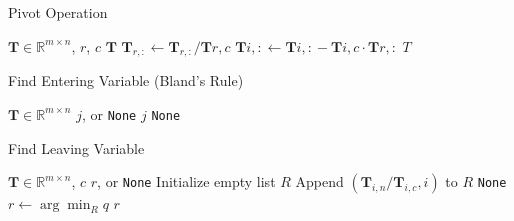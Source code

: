 \documentclass[conference]{IEEEtran}
\begin{document}
\begin{algorithm}
\caption{Pivot Operation}
\label{alg:pivot}
\begin{algorithmic}[1]
\Require $\textbf{T} \in \mathbb{R}^{m \times n}$, $r$, $c$
\Ensure $\textbf{T}$
\State $\textbf{T}_{r, :} \gets \textbf{T}_{r, :} / \textbf{T}{r, c}$ 
    \State $\textbf{T}{i, :} \gets \textbf{T}{i, :} - \textbf{T}{i, c} \cdot \textbf{T}{r, :}$ 
\EndFor
\State \Return $T$ 
\end{algorithmic}
\end{algorithm}

\begin{algorithm}
\caption{Find Entering Variable (Bland's Rule)}
\label{alg:entering}
\begin{algorithmic}[1]
\Require $\textbf{T} \in \mathbb{R}^{m \times n}$ 
\Ensure $j$, or \texttt{None}
        \State \Return $j$ 
    \EndIf
\EndFor
\State \Return \texttt{None} 
\end{algorithmic}
\end{algorithm}

\begin{algorithm}
\caption{Find Leaving Variable}
\label{alg:leaving}
\begin{algorithmic}[1]
\Require $\textbf{T} \in \mathbb{R}^{m \times n}$, $c$
\Ensure $r$, or \texttt{None}
\State Initialize empty list $R$
        \State Append $(\textbf{T}_{i, n} / \textbf{T}_{i, c}, i)$ to $R$
    \EndIf
\EndFor
{}
    \State \Return \texttt{None} 
\EndIf
\State $r \gets \arg \min_R q$ 
\State \Return $r$ 
\end{algorithmic}
\end{algorithm}
\end{document}
